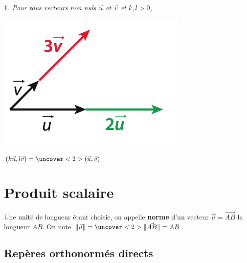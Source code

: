 \documentclass{beamer}
\newtheorem{proposition}[theorem]{\translate{Proposition}}
\theoremstyle{plain}
\begin{document}
\begin{frame}

\begin{proposition}
Pour tous vecteurs non nuls $\vec{u}$ et $\vec{v}$
et $k,l>0$, 
 \begin{center}
    \includegraphics[scale=0.5]{../Images/2u3v.png}
    
    $(k\vec{u},l\vec{v})=\uncover<2>{(\vec{u},\vec{v})}$
  \end{center}
\end{proposition}


 \end{frame}
 
  \section{Produit scalaire}
 
 
 \begin{frame}
 \begin{definition}
  Une unité de longueur étant choisie, on appelle \textbf{norme} d'un vecteur $\vec{u}=\vec{AB}$
  la longueur $AB$. On note $\|\vec{u}\|=\uncover<2>{\|\vec{AB}\|}=AB$.
 \end{definition}
\end{frame}

 \subsection{Repères orthonormés directs}
\end{document}
